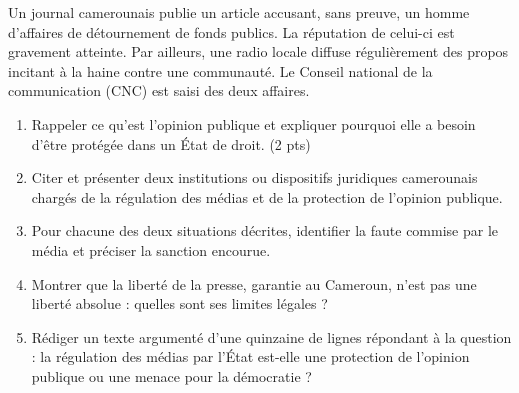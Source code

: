 \documentclass[11pt]{article}
\begin{document}
\begin{exercice}
Un journal camerounais publie un article accusant, sans preuve, un homme d'affaires de détournement de fonds publics. La réputation de celui-ci est gravement atteinte. Par ailleurs, une radio locale diffuse régulièrement des propos incitant à la haine contre une communauté. Le Conseil national de la communication (CNC) est saisi des deux affaires.
\begin{enumerate}
\item Rappeler ce qu'est l'opinion publique et expliquer pourquoi elle a besoin d'être protégée dans un État de droit. (2 pts)
\item Citer et présenter deux institutions ou dispositifs juridiques camerounais chargés de la régulation des médias et de la protection de l'opinion publique.
\item Pour chacune des deux situations décrites, identifier la faute commise par le média et préciser la sanction encourue.
\item Montrer que la liberté de la presse, garantie au Cameroun, n'est pas une liberté absolue : quelles sont ses limites légales ?
\item Rédiger un texte argumenté d'une quinzaine de lignes répondant à la question : la régulation des médias par l'État est-elle une protection de l'opinion publique ou une menace pour la démocratie ?
\end{enumerate}
\end{exercice}
\end{document}
